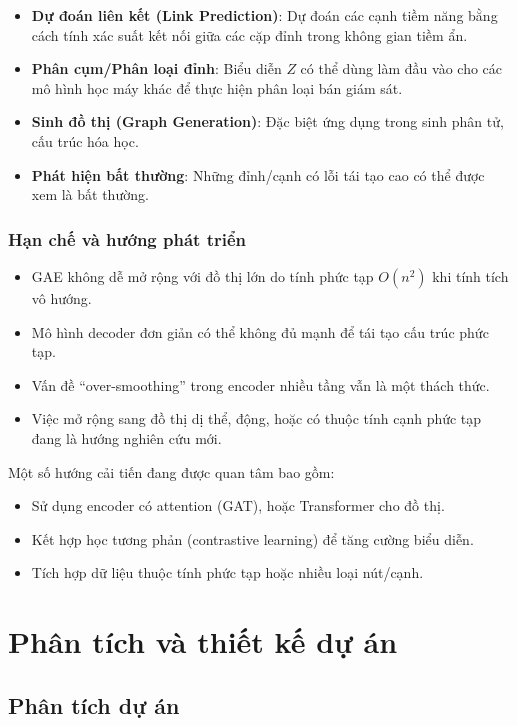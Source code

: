 \documentclass[a4paper]{article}
\begin{document}
\begin{itemize}
  \item \textbf{Dự đoán liên kết (Link Prediction)}: Dự đoán các cạnh tiềm năng bằng cách tính xác suất kết nối giữa các cặp đỉnh trong không gian tiềm ẩn.
  \item \textbf{Phân cụm/Phân loại đỉnh}: Biểu diễn $Z$ có thể dùng làm đầu vào cho các mô hình học máy khác để thực hiện phân loại bán giám sát.
  \item \textbf{Sinh đồ thị (Graph Generation)}: Đặc biệt ứng dụng trong sinh phân tử, cấu trúc hóa học.
  \item \textbf{Phát hiện bất thường}: Những đỉnh/cạnh có lỗi tái tạo cao có thể được xem là bất thường.
\end{itemize}

\subsubsection{Hạn chế và hướng phát triển}

\begin{itemize}
  \item GAE không dễ mở rộng với đồ thị lớn do tính phức tạp $O(n^2)$ khi tính tích vô hướng.
  \item Mô hình decoder đơn giản có thể không đủ mạnh để tái tạo cấu trúc phức tạp.
  \item Vấn đề ``over-smoothing'' trong encoder nhiều tầng vẫn là một thách thức.
  \item Việc mở rộng sang đồ thị dị thể, động, hoặc có thuộc tính cạnh phức tạp đang là hướng nghiên cứu mới.
\end{itemize}

Một số hướng cải tiến đang được quan tâm bao gồm:
\begin{itemize}
  \item Sử dụng encoder có attention (GAT), hoặc Transformer cho đồ thị.
  \item Kết hợp học tương phản (contrastive learning) để tăng cường biểu diễn.
  \item Tích hợp dữ liệu thuộc tính phức tạp hoặc nhiều loại nút/cạnh.
\end{itemize}


\newpage
\section{Phân tích và thiết kế dự án}
\subsection{Phân tích dự án}
\end{document}
